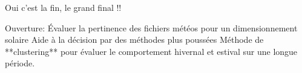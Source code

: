 Oui c’est la fin, le grand final !!

Ouverture:
Évaluer la pertinence des fichiers météos pour un dimensionnement solaire
Aide à la décision par des méthodes plus poussées
Méthode de **clustering** pour évaluer le comportement hivernal et estival sur une
longue période.
